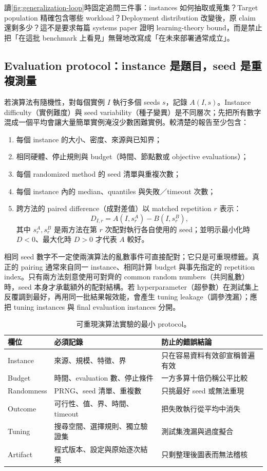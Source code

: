 \documentclass[11pt,a4paper,oneside,openany]{book}
\begin{document}
讀\cref{fig:generalization-loop}時固定追問三件事：instances 如何抽取或蒐集？Target population 精確包含哪些 workload？Deployment distribution 改變後，原 claim 還剩多少？這不是要求每篇 systems paper 證明 learning-theory bound，而是禁止把「在這批 benchmark 上看見」無聲地改寫成「在未來部署通常成立」。

\subsection{Evaluation protocol：instance 是題目，seed 是重複測量}
若演算法有隨機性，對每個實例 $I$ 執行多個 seeds $s$，記錄 $A(I,s)$。Instance difficulty（實例難度）與 seed variability（種子變異）是不同層次；先把所有數字混成一個平均會讓大量簡單實例淹沒少數困難實例。較清楚的報告至少包含：
\begin{enumerate}
 \item 每個 instance 的大小、密度、來源與已知界；
 \item 相同硬體、停止規則與 budget（時間、節點數或 objective evaluations）；
 \item 每個 randomized method 的 seed 清單與重複次數；
 \item 每個 instance 內的 median、quantiles 與失敗／timeout 次數；
 \item 跨方法的 paired difference（成對差值）以 matched repetition $r$ 表示：
 \[
   D_{I,r}=A(I,s^A_r)-B(I,s^B_r),
 \]
 其中 $s^A_r,s^B_r$ 是兩方法在第 $r$ 次配對執行各自使用的 seed；並明示最小化時 $D<0$、最大化時 $D>0$ 才代表 $A$ 較好。
\end{enumerate}

相同 seed 數字不一定使兩演算法的亂數事件可直接配對；它只是可重現標籤。真正的 pairing 通常來自同一 instance、相同計算 budget 與事先指定的 repetition index。只有兩方法刻意使用可對齊的 common random numbers（共同亂數）時，seed 本身才承載額外的配對結構。若 hyperparameter（超參數）在測試集上反覆調到最好，再用同一批結果報效能，會產生 tuning leakage（調參洩漏）；應把 tuning instances 與 final evaluation instances 分開。

\begin{table}[htbp]
\centering
\caption{可重現演算法實驗的最小 protocol。}
\begin{tabularx}{\textwidth}{@{}p{}YY@{}}
\toprule
欄位 & 必須記錄 & 防止的錯誤結論 \\
\midrule
Instance & 來源、規模、特徵、界 & 只在容易資料有效卻宣稱普遍有效 \\
Budget & 時間、evaluation 數、停止條件 & 一方多算十倍仍稱公平比較 \\
Randomness & PRNG、seed 清單、重複數 & 只挑最好 seed 或無法重現 \\
Outcome & 可行性、值、界、時間、timeout & 把失敗執行從平均中消失 \\
Tuning & 搜尋空間、選擇規則、獨立驗證集 & 測試集洩漏與過度擬合 \\
Artifact & 程式版本、設定與原始逐次結果 & 只剩整理後圖表而無法稽核 \\
\bottomrule
\end{tabularx}
\label{tab:experiment-protocol}
\end{table}
\end{document}
